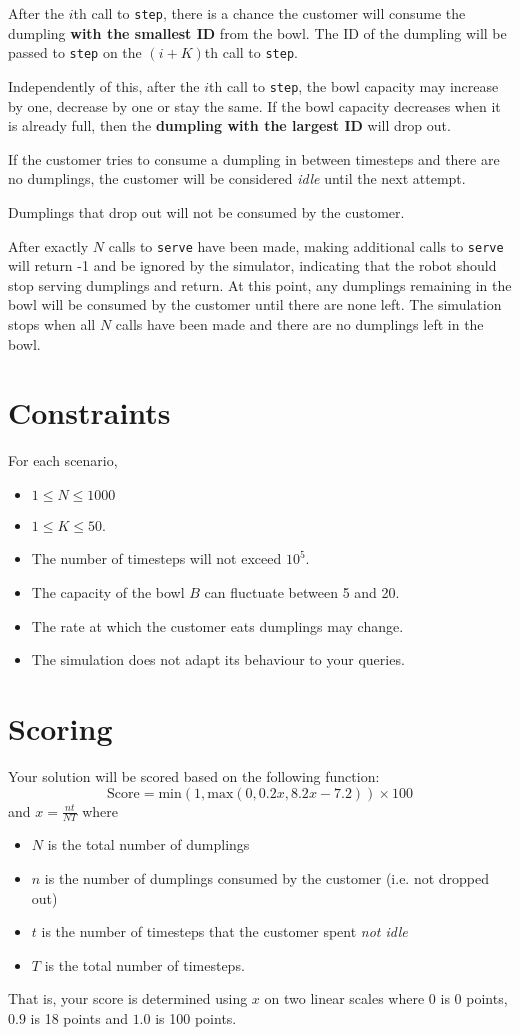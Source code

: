 \documentclass{article}
\begin{document}
After the $i$th call to {\tt step}, there is a chance the customer will consume the dumpling {\bf with the smallest ID} from the bowl. The ID of the dumpling will be passed to {\tt step} on the $(i+K)$th call to {\tt step}.

Independently of this, after the $i$th call to {\tt step}, the bowl capacity may increase by one, decrease by one or stay the same. If the bowl capacity decreases when it is already full, then the {\bf dumpling with the largest ID} will drop out.

If the customer tries to consume a dumpling in between timesteps and there are no dumplings, the customer will be considered {\it idle} until the next attempt.

Dumplings that drop out will not be consumed by the customer.

After exactly $N$ calls to {\tt serve} have been made, making additional calls to {\tt serve} will return -1 and be ignored by the simulator, indicating that the robot should stop serving dumplings and return. At this point, any dumplings remaining in the bowl will be consumed by the customer until there are none left. The simulation stops when all $N$ calls have been made and there are no dumplings left in the bowl.

\section*{Constraints}
For each scenario,
\begin{itemize}
\item $1 \le N \le 1000$
\item $1 \le K \le 50$.
\item The number of timesteps will not exceed $10^5$.
\item The capacity of the bowl $B$ can fluctuate between 5 and 20.
\item The rate at which the customer eats dumplings may change.
\item The simulation does not adapt its behaviour to your queries.
\end{itemize}

\newpage

\section*{Scoring}

Your solution will be scored based on the following function:
$$\mathrm{Score} = \mathrm{min}\left(1, \mathrm{max}\left(0, 0.2x, 8.2x - 7.2\right)\right) \times 100$$
and $x = \frac{nt}{NT}$ where
\begin{itemize}
\item $N$ is the total number of dumplings
\item $n$ is the number of dumplings consumed by the customer (i.e. not dropped out)
\item $t$ is the number of timesteps that the customer spent {\it not idle}
\item $T$ is the total number of timesteps.
\end{itemize}
\noindent That is, your score is determined using $x$ on two linear scales where $0$ is 0 points, $0.9$ is 18 points and $1.0$ is 100 points.
\end{document}
